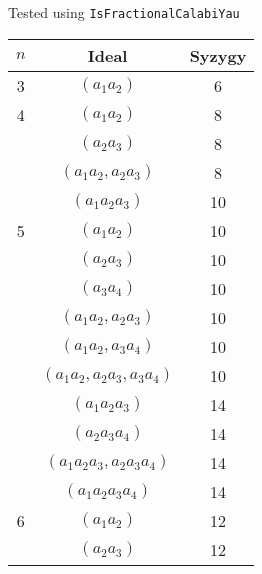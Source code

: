 \documentclass{article}
\begin{document}
\begin{flushleft}
   \begin{center}
   \end{center}
   Tested using \texttt{IsFractionalCalabiYau}
   \begin{multicols*}{2}
      \begin{center}
         \begin{tabular}{|c|c|c|}
            \hline
            $n$ & Ideal & Syzygy \\
            \hline 
            3 & $(a_1a_2)$ & 6 \\
            \hline
            4 & $(a_1a_2)$ & 8 \\
            & $(a_2a_3)$ & 8 \\
            & $(a_1a_2, a_2a_3)$ & 8 \\
            & $(a_1a_2a_3)$ & 10 \\
            \hline
            5 & $(a_1a_2)$ & 10 \\
            & $(a_2a_3)$ & 10 \\
            & $(a_3a_4)$ & 10 \\
            & $(a_1a_2, a_2a_3)$ & 10 \\
            & $(a_1a_2, a_3a_4)$ & 10 \\
            & $(a_1a_2, a_2a_3, a_3a_4)$ & 10 \\
            & $(a_1a_2a_3)$ & 14 \\
            & $(a_2a_3a_4)$ & 14 \\
            & $(a_1a_2a_3, a_2a_3a_4)$ & 14 \\
            & $(a_1a_2a_3a_4)$ & 14 \\
            \hline
            6 & $(a_1a_2)$ & 12 \\
            & $(a_2a_3)$ & 12 \\

\end{tabular}
\end{center}
\end{multicols*}
\end{flushleft}
\end{document}
